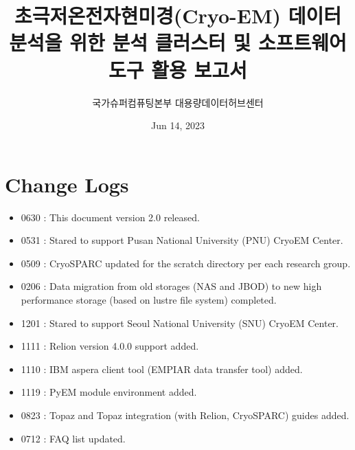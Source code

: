 \documentclass[a4paper,11pt,english]{sphinxmanual}
\title{초극저온전자현미경(Cryo-EM) 데이터 분석을 위한 분석 클러스터 및 소프트웨어 도구 활용 보고서}
\date{Jun 14, 2023}
\author{국가슈퍼컴퓨팅본부 대용량데이터허브센터}
\begin{document}
\pagestyle{empty}
\sphinxmaketitle
\pagestyle{plain}
\sphinxtableofcontents
\pagestyle{normal}
\label{\detokenize{index::doc}}


\sphinxstepscope


\chapter{Change Logs}
\label{\detokenize{changelog:change-logs}}\label{\detokenize{changelog::doc}}\begin{itemize}
\item {} 
\sphinxhyphen{}06\sphinxhyphen{}30 : This document version 2.0 released.

\item {} 
\sphinxhyphen{}05\sphinxhyphen{}31 : Stared to support Pusan National University (PNU) Cryo\sphinxhyphen{}EM Center.

\item {} 
\sphinxhyphen{}05\sphinxhyphen{}09 : CryoSPARC updated for the scratch directory per each research group.

\item {} 
\sphinxhyphen{}02\sphinxhyphen{}06 : Data migration from old storages (NAS and JBOD) to new high performance storage (based on lustre file system) completed.

\item {} 
\sphinxhyphen{}12\sphinxhyphen{}01 : Stared to support Seoul National University (SNU) Cryo\sphinxhyphen{}EM Center.

\item {} 
\sphinxhyphen{}11\sphinxhyphen{}11 : Relion version 4.0.0 support added.

\item {} 
\sphinxhyphen{}11\sphinxhyphen{}10 : IBM aspera client tool (EMPIAR data transfer tool) added.

\item {} 
\sphinxhyphen{}11\sphinxhyphen{}19 : PyEM module environment added.

\item {} 
\sphinxhyphen{}08\sphinxhyphen{}23 : Topaz and Topaz integration (with Relion, CryoSPARC) guides added.

\item {} 
\sphinxhyphen{}07\sphinxhyphen{}12 : FAQ list updated.


\end{itemize}
\end{document}
